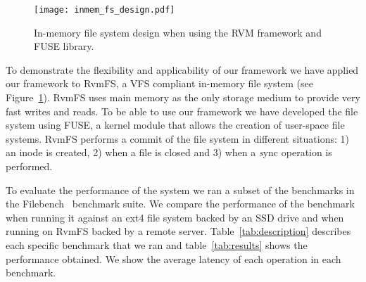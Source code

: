 
\begin{figure}[t]
\begin{center}
\texttt{[image: inmem\_fs\_design.pdf]}
\end{center}
\caption{In-memory file system design when using the RVM framework and FUSE library.}
\label{fig:inmem_fs_design}
\end{figure}

To demonstrate the flexibility and applicability of our framework we have
applied our framework to RvmFS, a VFS compliant in-memory file system (see
Figure~\ref{fig:inmem_fs_design}).  RvmFS uses main memory as the only storage
medium to provide very fast writes and reads.  To be able to use our framework
we have developed the file system using FUSE, a kernel module that allows the
creation of user-space file systems.  RvmFS performs a commit of the file
system in different situations: 1) an inode is created, 2) when a file is
closed and 3) when a {\emph sync} operation is performed.

To evaluate the performance of the system we ran a subset of the benchmarks in
the Filebench~\cite{filebench} benchmark suite.  We compare the performance of
the benchmark when running it against an ext4 file system backed by an SSD
drive and when running on RvmFS backed by a remote server.
Table~\ref{tab:description} describes each specific benchmark that we ran and
table~\ref{tab:results} shows the performance obtained.  We show the average
latency of each operation in each benchmark.

\begin{table}[h]
\centering
\caption{Description of the macro-benchmark tests used to evaluate RvmFS.}
\label{tab:description}
\end{table}

